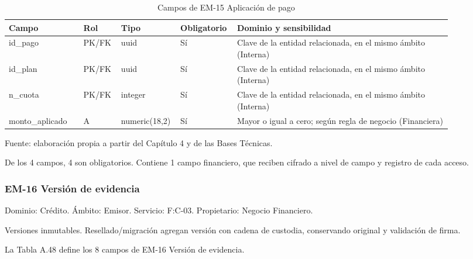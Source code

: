 \documentclass[11pt]{article}
\begin{document}
\begin{table}[htbp]
\caption{Campos de EM-15 Aplicación de pago}\label{tab:d_em15}
\centering
\begin{tabular}{@{}p{0.167\linewidth}p{0.070\linewidth}p{0.079\linewidth}p{0.097\linewidth}p{0.465\linewidth}@{}}
\toprule Campo & Rol & Tipo & Obligatorio & Dominio y sensibilidad \\
\midrule
id\_pago & PK/FK & uuid & Sí & Clave de la entidad relacionada, en el mismo ámbito (Interna) \\
id\_plan & PK/FK & uuid & Sí & Clave de la entidad relacionada, en el mismo ámbito (Interna) \\
n\_cuota & PK/FK & integer & Sí & Clave de la entidad relacionada, en el mismo ámbito (Interna) \\
monto\_aplicado & A & numeric(18,2) & Sí & Mayor o igual a cero; según regla de negocio (Financiera) \\
\bottomrule
\end{tabular}
\par\smallskip
{\raggedright Fuente: elaboración propia a partir del Capítulo 4 y de las Bases Técnicas.\par}
\end{table}


De los 4 campos, 4 son obligatorios. Contiene 1 campo financiero, que reciben cifrado a nivel de campo y registro de cada acceso.

\subsubsection{EM-16 Versión de evidencia}

Dominio: Crédito. Ámbito: Emisor. Servicio: F:C-03. Propietario: Negocio Financiero.

Versiones inmutables. Resellado/migración agregan versión con cadena de custodia, conservando original y validación de firma.

La Tabla A.48 define los 8 campos de EM-16 Versión de evidencia.
\end{document}
